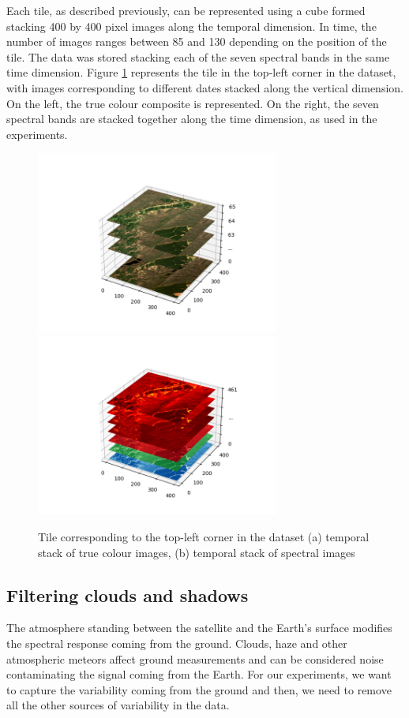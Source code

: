 \documentclass[essd, manuscript]{copernicus}
\begin{document}
Each tile, as described previously, can be represented using a cube formed stacking 400 by 400 pixel images along the temporal dimension. In time, the number of images ranges between 85 and 130 depending on the position of the tile. The data was stored stacking each of the seven spectral bands in the same time dimension. Figure \ref{dataset_detail} represents the tile in the top-left corner in the dataset, with images corresponding to different dates stacked along the vertical dimension. On the left, the true colour composite is represented. On the right, the seven spectral bands are stacked together along the time dimension, as used in the experiments. 

\begin{figure}%
    {{\includegraphics[width=8cm]{fig2a.png} }}%
    {{\includegraphics[width=8cm]{fig2b.png} }}%
    \caption{Tile corresponding to the top-left corner in the dataset (a) temporal stack of true colour images, (b) temporal stack of spectral images}%
    \label{dataset_detail}%
\end{figure}

\subsection{Filtering clouds and shadows}
The atmosphere standing between the satellite and the Earth's surface modifies the spectral response coming from the ground. Clouds, haze and other atmospheric meteors affect ground measurements and can be considered noise contaminating the signal coming from the Earth. For our experiments, we want to capture the variability coming from the ground and then, we need to remove all the other sources of variability in the data.
\end{document}
